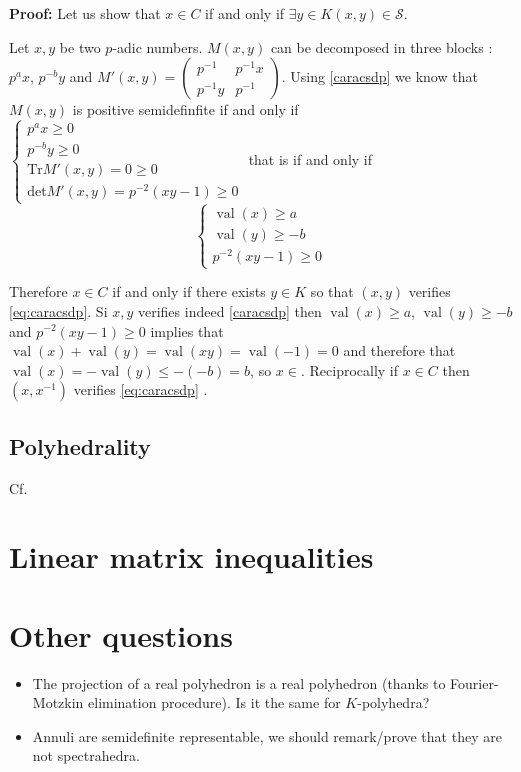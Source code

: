 \documentclass[a4paper,12pt]{article}
\newenvironment{proof}{\hbox{}\vspace{-0.5cm} {\bf Proof:}}{\hfill $\Box$ \\}
\DeclareMathOperator{\val}{val}
\begin{document}
\begin{proof}
Let us show that $x \in C$ if and only if  $\exists y \in K \left( x,y \right) \in \mathcal{S}$.

Let $x,y$ be two $p$-adic numbers.
$M(x,y)$ can be decomposed in three blocks : $p^ax$, $p^{-b}y $ and $M'(x,y) = \begin{pmatrix} p^{-1} & p^{-1}x \\ p^{-1} y & p^{-1}\end{pmatrix} $. Using \ref{caracsdp} we know that $M(x,y)$ is positive semidefinfite if and only if
$
\begin{cases}
	p^ax \ge 0 \\
	p^{-b}y \ge 0\\
	\text{Tr}M'\left( x,y \right) = 0 \ge 0\\
	\text{det} M'(x,y ) = p^{-2}\left( xy-1 \right)  \ge 0 
\end{cases}
$ 
that is if and only if 
\begin{equation}
	\label{eq:caracsdp} 
	\begin{cases} 
		\val\left(x\right)\ge a\\
		\val\left(y\right)\ge -b\\
		p^{-2} \left( xy-1 \right) \ge 0
	\end{cases}
\end{equation}




Therefore $x \in C$ if and only if there exists $y \in K $ so that $(x, y)$ verifies \ref{eq:caracsdp}. Si $x, y$ verifies indeed \ref{caracsdp} then $\val\left(x\right)\ge a$, $\val\left(y\right)\ge -b$ and $p^{-2} \left( xy-1 \right) \ge 0$ implies that $\val\left(x\right)+\val\left(y\right)=\val\left(xy\right) = \val\left(-1\right) =0$ and therefore that $\val\left(x\right)=-\val\left(y\right)\le -(-b)  =b$, so $x \in $. Reciprocally if $x \in C$ then $(x,x^{-1}) $ verifies \ref{eq:caracsdp}  .


\subsection{Polyhedrality}
Cf. \cite{bhardwaj2015deciding}

\section{Linear matrix inequalities}


\section{Other questions}
\begin{itemize}
\item The projection of a real polyhedron is a real polyhedron (thanks to Fourier-Motzkin elimination procedure). Is it the same for $K$-polyhedra?
\item Annuli are semidefinite representable, we should remark/prove that they are not spectrahedra.
\end{itemize}

\printbibliography
\end{document}

